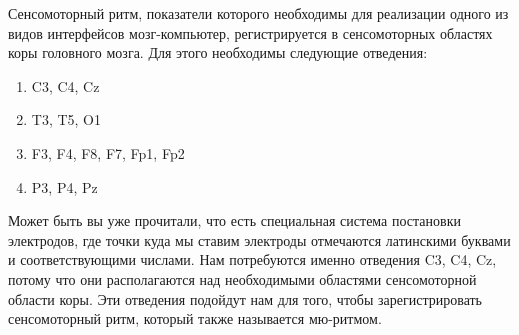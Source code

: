 
Сенсомоторный ритм, показатели которого необходимы для реализации одного из видов интерфейсов мозг-компьютер, регистрируется в сенсомоторных областях коры головного мозга. Для этого необходимы следующие отведения:

\begin{enumerate}
    \item C3, C4, Cz
    \item T3, T5, O1
    \item F3, F4, F8, F7, Fp1, Fp2
    \item P3, P4, Pz
\end{enumerate}

\explanationSection

Может быть вы уже прочитали, что есть специальная система постановки электродов, где точки куда мы ставим электроды отмечаются латинскими буквами и соответствующими числами. Нам потребуются именно отведения C3, C4, Cz, потому что они располагаются над необходимыми областями сенсомоторной области коры. Эти отведения подойдут нам для того, чтобы зарегистрировать сенсомоторный ритм, который также называется мю-ритмом.

